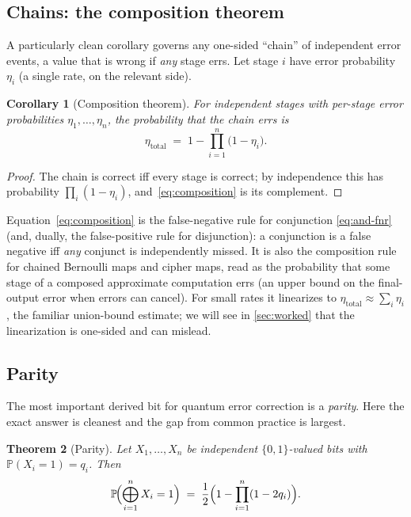\documentclass[11pt]{article}
\numberwithin{equation}{section}
\theoremstyle{plain}
\newtheorem{theorem}{Theorem}[section]
\newtheorem{corollary}[theorem]{Corollary}
\theoremstyle{definition}
\theoremstyle{remark}
\newcommand{\Prob}{\mathbb{P}}
\newcommand{\bits}{\{0,1\}}
\newcommand{\bigxor}{\bigoplus}
\begin{document}
\subsection{Chains: the composition theorem}

A particularly clean corollary governs any one-sided ``chain'' of independent
error events, a value that is wrong if \emph{any} stage errs. Let stage $i$
have error probability $\eta_i$ (a single rate, on the relevant side).

\begin{corollary}[Composition theorem]
\label{cor:composition}
For independent stages with per-stage error probabilities $\eta_1,\dots,\eta_n$,
the probability that the chain errs is
\begin{equation}
\label{eq:composition}
  \eta_{\mathrm{total}} \;=\; 1 - \prod_{i=1}^{n}\bigl(1-\eta_i\bigr).
\end{equation}
\end{corollary}

\begin{proof}
The chain is correct iff every stage is correct; by independence this has
probability $\prod_i(1-\eta_i)$, and~\eqref{eq:composition} is its complement.
\end{proof}

Equation~\eqref{eq:composition} is the false-negative rule for conjunction
\eqref{eq:and-fnr} (and, dually, the false-positive rule for disjunction): a
conjunction is a false negative iff \emph{any} conjunct is independently missed.
It is also the composition rule for chained Bernoulli maps and cipher maps,
read as the probability that some stage of a composed approximate computation
errs (an upper bound on the final-output error when errors can cancel). For
small rates it linearizes to $\eta_{\mathrm{total}}\approx\sum_i\eta_i$, the
familiar union-bound estimate; we will see in \cref{sec:worked} that the
linearization is one-sided and can mislead.

\subsection{Parity}

The most important derived bit for quantum error correction is a \emph{parity}.
Here the exact answer is cleanest and the gap from common practice is largest.

\begin{theorem}[Parity]
\label{thm:parity}
Let $X_1,\dots,X_n$ be independent $\bits$-valued bits with
$\Prob(X_i=1)=q_i$. Then
\begin{equation}
\label{eq:parity}
  \Prob\!\Bigl(\bigxor_{i=1}^{n} X_i = 1\Bigr)
  \;=\; \frac12\Bigl(1 - \prod_{i=1}^{n}(1-2q_i)\Bigr).
\end{equation}
\end{theorem}
\end{document}
